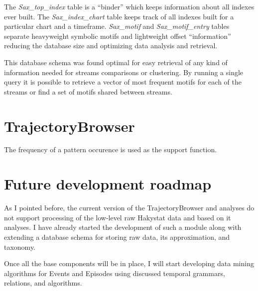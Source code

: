 The \textit{Sax\_top\_index} table is a ``binder'' which keeps information about all indexes ever built. The \textit{Sax\_index\_chart} table keeps track of all indexes built for a particular chart and a timeframe. \textit{Sax\_motif} and \textit{Sax\_motif\_entry} tables separate heavyweight symbolic motifs and lightweight offset ``information'' reducing the database size and optimizing data analysis and retrieval. 

This database schema was found optimal for easy retrieval of any kind of information needed for streams comparisons or clustering. By running a single query it is possible to retrieve a vector of most frequent motifs for each of the streams or find a set of motifs shared between streams.

\section{TrajectoryBrowser}
The frequency of a pattern occurence is used as the support function. 

\section{Future development roadmap}
As I pointed before, the current version of the TrajectoryBrowser and analyses do not support processing of the low-level raw Hakystat data and based on it analyses. I have already started the development of such a module along with extending a database schema for storing raw data, its approximation, and taxonomy.

Once all the base components will be in place, I will start developing data mining algorithms for Events and Episodes using discussed temporal grammars, relations, and algorithms.